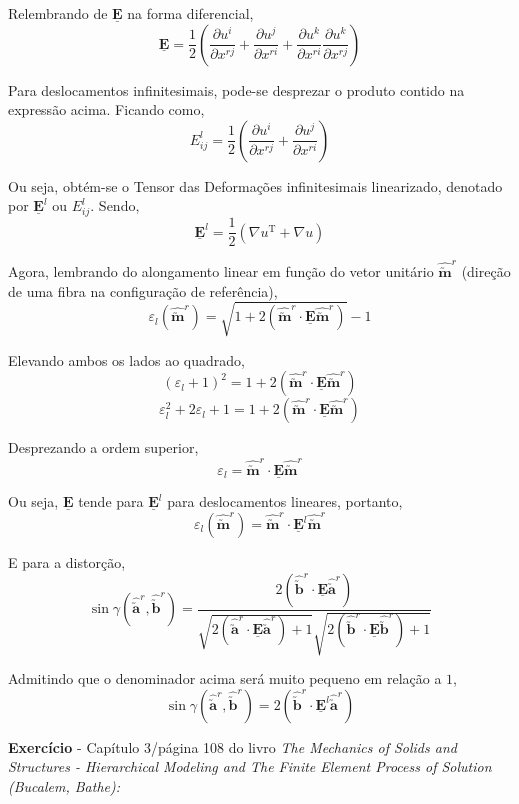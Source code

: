 Relembrando de $\underline{\mathbf{E}}$ na forma diferencial,
\[\underline{\mathbf{E}}=\frac{1}{2}\left( \frac{\partial u^i}{\partial x^{rj}}+\frac{\partial u^j}{\partial x^{ri}}+\frac{\partial u^k}{\partial x^{ri}}\frac{\partial u^k}{\partial x^{rj}} \right)\]

Para deslocamentos infinitesimais, pode-se desprezar o produto contido na expressão acima. Ficando como,
\[E_{ij}^l=\frac{1}{2}\left( \frac{\partial u^i}{\partial x^{rj}}+\frac{\partial u^j}{\partial x^{ri}}\right)\]

Ou seja, obtém-se o Tensor das Deformações infinitesimais linearizado, denotado por $\underline{\mathbf{E}}^l$ ou $E_{ij}^l$. Sendo,
\[\underline{\mathbf{E}}^l=\frac{1}{2}(\nabla u^{\text{T}}+\nabla u)\]

Agora, lembrando do alongamento linear em função do vetor unitário $\hat{\utilde{\mathbf{m}}}^r$ (direção de uma fibra na configuração de referência),
\[\varepsilon_l(\hat{\utilde{\mathbf{m}}}^r)=\sqrt{1+2(\hat{\utilde{\mathbf{m}}}^r\cdot\underline{\mathbf{E}}\hat{\utilde{\mathbf{m}}}^r)}-1\]

Elevando ambos os lados ao quadrado,
\[(\varepsilon_l+1)^2=1+2(\hat{\utilde{\mathbf{m}}}^r\cdot\underline{\mathbf{E}}\hat{\utilde{\mathbf{m}}}^r)\]
\[\varepsilon_l^2+2\varepsilon_l+1=1+2(\hat{\utilde{\mathbf{m}}}^r\cdot\underline{\mathbf{E}}\hat{\utilde{\mathbf{m}}}^r)\]

Desprezando a ordem superior,
\[\varepsilon_l=\hat{\utilde{\mathbf{m}}}^r\cdot\underline{\mathbf{E}}\hat{\utilde{\mathbf{m}}}^r\]

Ou seja, $\underline{\mathbf{E}}$ tende para $\underline{\mathbf{E}}^l$ para deslocamentos lineares, portanto,
\[\varepsilon_l(\hat{\utilde{\mathbf{m}}}^r)=\hat{\utilde{\mathbf{m}}}^r\cdot\underline{\mathbf{E}}^l\hat{\utilde{\mathbf{m}}}^r\]

E para a distorção,
\[\sin\gamma(\hat{\utilde{\mathbf{a}}}^r, \hat{\utilde{\mathbf{b}}}^r)=\frac{2(\hat{\utilde{\mathbf{b}}}^r\cdot\underline{\mathbf{E}}\hat{\utilde{\mathbf{a}}}^r)}{\sqrt{2(\hat{\utilde{\mathbf{a}}}^r\cdot\underline{\mathbf{E}}\hat{\utilde{\mathbf{a}}}^r)+1}\sqrt{2(\hat{\utilde{\mathbf{b}}}^r\cdot\underline{\mathbf{E}}\hat{\utilde{\mathbf{b}}}^r)+1}}\]

Admitindo que o denominador acima será muito pequeno em relação a $1$,
\[\sin\gamma(\hat{\utilde{\mathbf{a}}}^r, \hat{\utilde{\mathbf{b}}}^r)=2(\hat{\utilde{\mathbf{b}}}^r\cdot\underline{\mathbf{E}}^l\hat{\utilde{\mathbf{a}}}^r)\]

\textbf{Exercício} - Capítulo 3/página 108 do livro \textit{The Mechanics of Solids and Structures - Hierarchical Modeling and The Finite Element Process of Solution (Bucalem, Bathe):}

